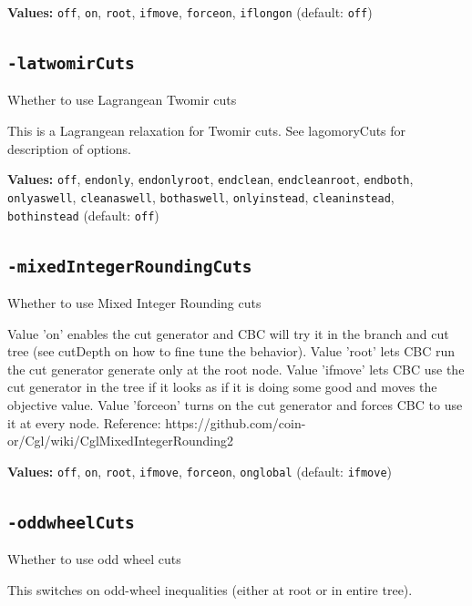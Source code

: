 \documentclass[11pt,a4paper]{article}
\begin{document}
\textbf{Values:} \texttt{off}, \texttt{on}, \texttt{root}, \texttt{ifmove}, \texttt{forceon}, \texttt{iflongon} (default: \texttt{off})

\subsection*{\texttt{-latwomirCuts}}

Whether to use Lagrangean Twomir cuts

This is a Lagrangean relaxation for Twomir cuts.  See lagomoryCuts for description of options.

\textbf{Values:} \texttt{off}, \texttt{endonly}, \texttt{endonlyroot}, \texttt{endclean}, \texttt{endcleanroot}, \texttt{endboth}, \texttt{onlyaswell}, \texttt{cleanaswell}, \texttt{bothaswell}, \texttt{onlyinstead}, \texttt{cleaninstead}, \texttt{bothinstead} (default: \texttt{off})

\subsection*{\texttt{-mixedIntegerRoundingCuts}}

Whether to use Mixed Integer Rounding cuts

Value 'on' enables the cut generator and CBC will try it in the branch and cut tree (see cutDepth on how to fine tune the behavior). Value 'root' lets CBC run the cut generator generate only at the root node. Value 'ifmove' lets CBC use the cut generator in the tree if it looks as if it is doing some good and moves the objective value. Value 'forceon' turns on the cut generator and forces CBC to use it at every node.
 Reference: https://github.com/coin-or/Cgl/wiki/CglMixedIntegerRounding2

\textbf{Values:} \texttt{off}, \texttt{on}, \texttt{root}, \texttt{ifmove}, \texttt{forceon}, \texttt{onglobal} (default: \texttt{ifmove})

\subsection*{\texttt{-oddwheelCuts}}

Whether to use odd wheel cuts

This switches on odd-wheel inequalities (either at root or in entire tree).
\end{document}
